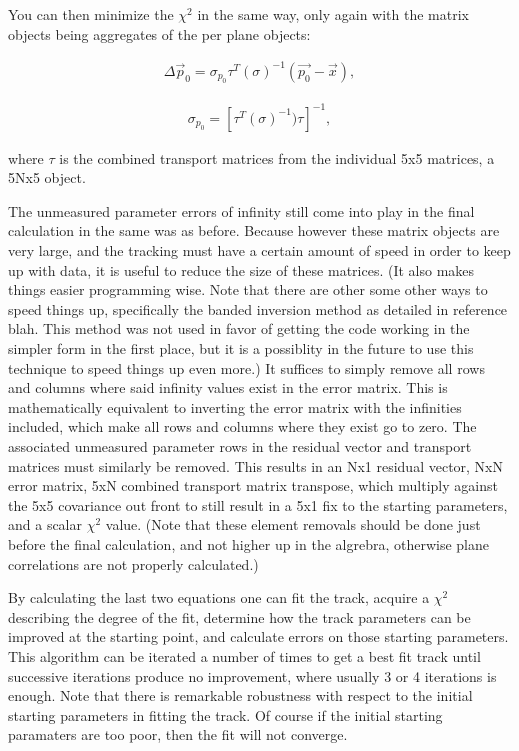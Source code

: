 \documentclass{article}
\begin{document}
You can then minimize the $\chi^{2}$ in the same way, only again with the matrix objects being aggregates of the per plane objects:

\begin{align} \label{eq:deltafull}
\Delta \vec{p}_{0} = \sigma_{p_{0}} \tau^{T}(\sigma)^{-1}(\vec{p_{0}}-\vec{x}),
\end{align}

\begin{align} \label{eq:covfull}
\sigma_{p_{0}} = [\tau^{T} (\sigma)^{-1}) \tau ]^{-1},
\end{align}

where $\tau$ is the combined transport matrices from the individual 5x5 matrices, a 5Nx5 object.

The unmeasured parameter errors of infinity still come into play in the final calculation in the same was as before. Because however these matrix objects are very large, and the tracking must have a certain amount of speed in order to keep up with data, it is useful to reduce the size of these matrices. (It also makes things easier programming wise. Note that there are other some other ways to speed things up, specifically the banded inversion method as detailed in reference blah. This method was not used in favor of getting the code working in the simpler form in the first place, but it is a possiblity in the future to use this technique to speed things up even more.) It suffices to simply remove all rows and columns where said infinity values exist in the error matrix. This is mathematically equivalent to inverting the error matrix with the infinities included, which make all rows and columns where they exist go to zero. The associated unmeasured parameter rows in the residual vector and transport matrices must similarly be removed. This results in an Nx1 residual vector, NxN error matrix, 5xN combined transport matrix transpose, which multiply against the 5x5 covariance out front to still result in a 5x1 fix to the starting parameters, and a scalar $\chi^2$ value. (Note that these element removals should be done just before the final calculation, and not higher up in the algrebra, otherwise plane correlations are not properly calculated.)


By calculating the last two equations one can fit the track, acquire a $\chi^{2}$ describing the degree of the fit, determine how the track parameters can be improved at the starting point, and calculate errors on those starting parameters. This algorithm can be iterated a number of times to get a best fit track until successive iterations produce no improvement, where usually 3 or 4 iterations is enough. Note that there is remarkable robustness with respect to the initial starting parameters in fitting the track. Of course if the initial starting paramaters are too poor, then the fit will not converge.
\end{document}
